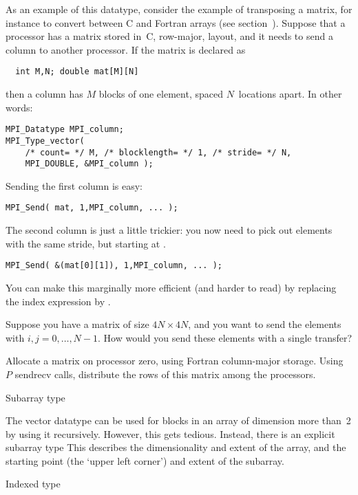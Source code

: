 As an example of this datatype, consider the example of transposing
a matrix, for instance to convert between
C and Fortran arrays (see section~). Suppose that 
a processor has a matrix stored in~C, row-major, layout, and it needs
to send a column to another processor. If the matrix is declared as
\begin{verbatim}
  int M,N; double mat[M][N]
\end{verbatim}
then a column has $M$ blocks of one element, spaced $N$~locations apart.
In other words:
\begin{verbatim}
MPI_Datatype MPI_column;
MPI_Type_vector( 
    /* count= */ M, /* blocklength= */ 1, /* stride= */ N,
    MPI_DOUBLE, &MPI_column );
\end{verbatim}
Sending the first column is easy:
\begin{verbatim}
MPI_Send( mat, 1,MPI_column, ... );
\end{verbatim}
The second column is just a little trickier: you now need to pick out 
elements with the same stride, but starting at .
\begin{verbatim}
MPI_Send( &(mat[0][1]), 1,MPI_column, ... );
\end{verbatim}
You can make this marginally more efficient (and harder to read)
by replacing the index expression by .

\begin{exercise}
  Suppose you have a matrix of size $4N\times 4N$, and you want to
  send the elements  with $i,j=0,\ldots,N-1$. How would
  you send these elements with a single transfer?
\end{exercise}

\begin{exercise}
  \label{ex:col-to-row}
  Allocate a matrix on processor zero, using Fortran column-major storage.
  Using $P$ sendrecv calls, distribute the rows of this matrix among the
  processors.
\end{exercise}

 {Subarray type}

The vector datatype can be used for blocks in an array of dimension
more than~2 by using it recursively. However, this gets
tedious. Instead, there is an explicit subarray type
%
%
This describes the dimensionality and extent of the array, and
the starting point (the `upper left corner') and extent of the subarray.

 {Indexed type}


